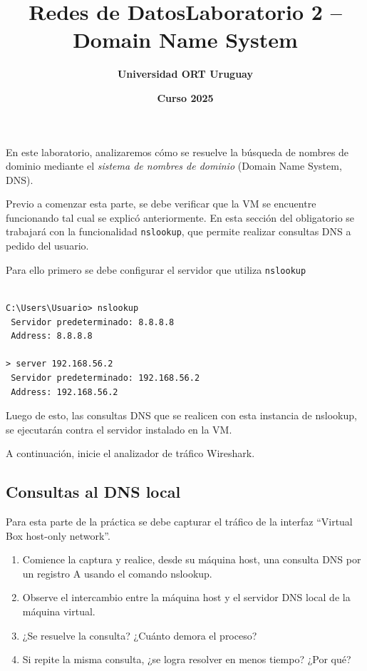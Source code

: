 \documentclass[a4paper,10pt]{article}
\title{\bf Redes de DatosLaboratorio 2 -- Domain Name System}
\author{\bf Universidad ORT Uruguay}
\date{\bf Curso 2025}
\begin{document}
\maketitle
\thispagestyle{fancy}

En este laboratorio, analizaremos cómo se resuelve la búsqueda de nombres de dominio mediante el \emph{sistema de nombres de dominio} (Domain Name System, DNS).

Previo a comenzar esta parte, se debe verificar que la VM se encuentre funcionando tal cual se explicó anteriormente. En esta sección del obligatorio se trabajará con la funcionalidad \texttt{nslookup}, que permite realizar consultas DNS a pedido del usuario.

Para ello primero se debe configurar el servidor que utiliza \texttt{nslookup}

\begin{verbatim}

C:\Users\Usuario> nslookup
 Servidor predeterminado: 8.8.8.8
 Address: 8.8.8.8

> server 192.168.56.2
 Servidor predeterminado: 192.168.56.2
 Address: 192.168.56.2

\end{verbatim}

Luego de esto, las consultas DNS que se realicen con esta instancia de nslookup, se ejecutarán contra el servidor instalado en la VM.  

A continuación, inicie el analizador de tráfico Wireshark. 

\subsection*{Consultas al DNS local}

Para esta parte de la práctica se debe capturar el tráfico de la interfaz ``Virtual Box host-only network''.

\begin{enumerate}
    \item Comience la captura y realice, desde su máquina host, una consulta DNS por un registro A usando el comando nslookup.
    \item Observe el intercambio entre la máquina host y el servidor DNS local de la máquina virtual.
    \item ¿Se resuelve la consulta? ¿Cuánto demora el proceso?
    \item Si repite la misma consulta, ¿se logra resolver en menos tiempo? ¿Por qué?
\end{enumerate}
\end{document}
